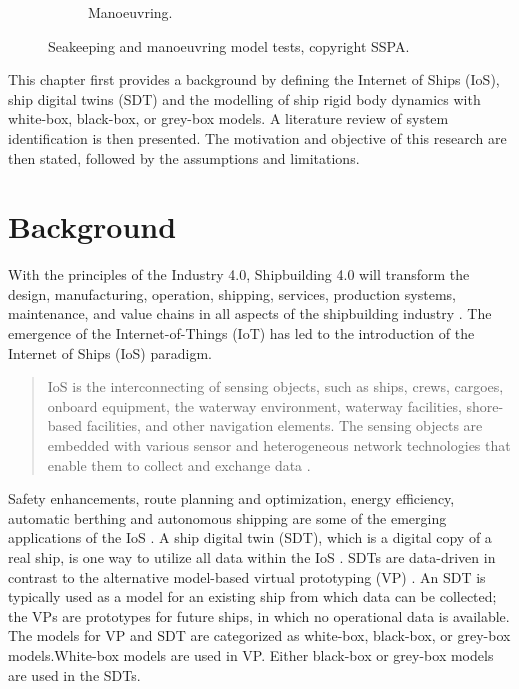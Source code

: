 \begin{figure}
\begin{subfigure}[b]{0.45\textwidth}
         \caption{Manoeuvring.}
         \label{fig:manoeuvring}
     \end{subfigure}
     \hfill
    \caption{Seakeeping and manoeuvring model tests, copyright SSPA.}
    \label{fig:seakeeping_and_manoeuvring}

\end{figure}
This chapter first provides a background by defining the Internet of Ships (IoS), ship digital twins (SDT) and the modelling of ship rigid body dynamics with white-box, black-box, or grey-box models. A literature review of system identification is then presented.
The motivation and objective of this research are then stated, followed by the assumptions and limitations.



\section{Background}
With the principles of the Industry 4.0, Shipbuilding 4.0 will transform the design, manufacturing, operation, shipping, services, production systems, maintenance, and value chains in all aspects of the shipbuilding 
industry \cite{stanic_toward_2018}.
The emergence of the Internet-of-Things (IoT) has led to the introduction of the Internet of Ships (IoS) paradigm. \begin{quote} IoS is the interconnecting of sensing objects, such as ships, crews, cargoes, onboard equipment, the waterway environment, waterway facilities, shore-based facilities, and other navigation elements. The sensing objects are embedded with various sensor and heterogeneous network technologies that enable them to collect and exchange data \cite{liu_internet_2016-1}.\end{quote}
Safety enhancements, route planning and optimization, energy efficiency, automatic berthing and autonomous shipping are some of the emerging applications of the IoS \cite{aslam_internet_2020}.
A ship digital twin (SDT), which is a digital copy of a real ship, is one way to utilize all data within the IoS \cite{chen_review_2021}. 
SDTs are data-driven in contrast to the alternative model-based virtual prototyping (VP) \cite{major_framework_2021}. An SDT is typically used as a model for an existing ship from which data can be collected; the VPs are  prototypes for future ships, in which no operational data is available.
The models for VP and SDT are categorized as white-box, black-box, or grey-box models.White-box models are used in VP. Either black-box or grey-box models are used in the SDTs. 
